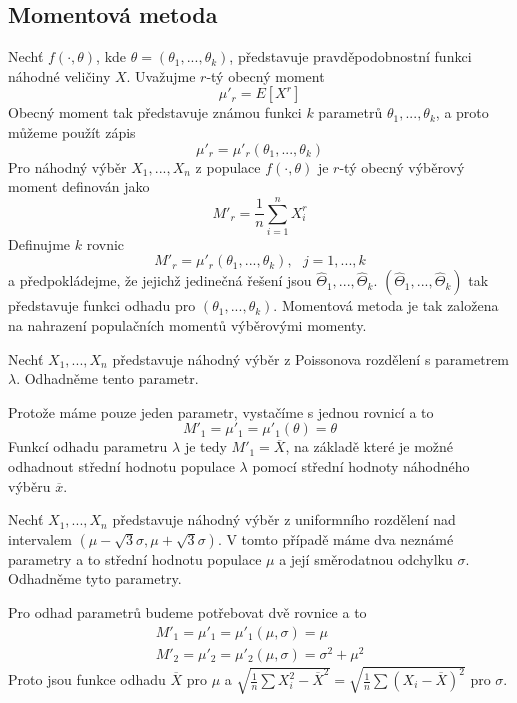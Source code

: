 \subsection{Momentová metoda}

Nechť $f(\cdot, \theta)$, kde $\theta = (\theta_1, ..., \theta_k)$, představuje pravděpodobnostní funkci náhodné veličiny $X$. Uvažujme $r$-tý obecný moment
\begin{equation*}
\mu'_r = E[X^r]
\end{equation*}
Obecný moment tak představuje známou funkci $k$ parametrů $\theta_1, ..., \theta_k$, a proto můžeme použít zápis
\begin{equation*}
\mu'_r = \mu'_r(\theta_1, ..., \theta_k)
\end{equation*}
Pro náhodný výběr $X_1, ..., X_n$ z populace $f(\cdot, \theta)$ je $r$-tý obecný výběrový moment definován jako
\begin{equation*}
M'_r = \frac{1}{n}\sum_{i = 1}^n X_i^r
\end{equation*}
Definujme $k$ rovnic
\begin{equation*}
M'_r = \mu'_r(\theta_1, ..., \theta_k), ~~~ j = 1, ..., k
\end{equation*}
a předpokládejme, že jejichž jedinečná řešení jsou $\hat{\Theta}_1, ..., \hat{\Theta}_k$. $(\hat{\Theta}_1, ..., \hat{\Theta}_k)$ tak představuje funkci odhadu pro $(\theta_1, ..., \theta_k)$. Momentová metoda je tak založena na nahrazení populačních momentů výběrovými momenty.

\begin{example}
Nechť $X_1, ..., X_n$ představuje náhodný výběr z Poissonova rozdělení s parametrem $\lambda$. Odhadněme tento parametr.

Protože máme pouze jeden parametr, vystačíme s jednou rovnicí a to
\begin{equation*}
M'_1 = \mu'_1 = \mu'_1(\theta) = \theta
\end{equation*}
Funkcí odhadu parametru $\lambda$ je tedy $M'_1 = \overline{X}$, na základě které je možné odhadnout střední hodnotu populace $\lambda$ pomocí střední hodnoty náhodného výběru $\overline{x}$.
\end{example}

\begin{example}
Nechť $X_1, ..., X_n$ představuje náhodný výběr z uniformního rozdělení nad intervalem $(\mu - \sqrt{3}\sigma, \mu + \sqrt{3} \sigma)$. V tomto případě máme dva neznámé parametry a to střední hodnotu populace $\mu$ a její směrodatnou odchylku $\sigma$. Odhadněme tyto parametry.

Pro odhad parametrů budeme potřebovat dvě rovnice a to
\begin{gather*}
M'_1 = \mu'_1 = \mu'_1(\mu, \sigma) = \mu\\
M'_2 = \mu'_2 = \mu'_2(\mu, \sigma) = \sigma^2 + \mu^2
\end{gather*}
Proto jsou funkce odhadu $\overline{X}$ pro $\mu$ a $\sqrt{\frac{1}{n}\sum X_i^2 - \overline{X}^2} = \sqrt{\frac{1}{n} \sum(X_i - \overline{X})^2}$ pro $\sigma$.
\end{example}

